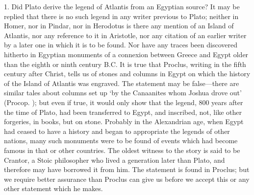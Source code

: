 \documentclass[11pt,letter]{article}
\begin{document}
\par  1. Did Plato derive the legend of Atlantis from an Egyptian source? It may be replied that there is no such legend in any writer previous to Plato; neither in Homer, nor in Pindar, nor in Herodotus is there any mention of an Island of Atlantis, nor any reference to it in Aristotle, nor any citation of an earlier writer by a later one in which it is to be found. Nor have any traces been discovered hitherto in Egyptian monuments of a connexion between Greece and Egypt older than the eighth or ninth century B.C. It is true that Proclus, writing in the fifth century after Christ, tells us of stones and columns in Egypt on which the history of the Island of Atlantis was engraved. The statement may be false—there are similar tales about columns set up ‘by the Canaanites whom Joshua drove out’ (Procop. ); but even if true, it would only show that the legend, 800 years after the time of Plato, had been transferred to Egypt, and inscribed, not, like other forgeries, in books, but on stone. Probably in the Alexandrian age, when Egypt had ceased to have a history and began to appropriate the legends of other nations, many such monuments were to be found of events which had become famous in that or other countries. The oldest witness to the story is said to be Crantor, a Stoic philosopher who lived a generation later than Plato, and therefore may have borrowed it from him. The statement is found in Proclus; but we require better assurance than Proclus can give us before we accept this or any other statement which he makes.
\end{document}
